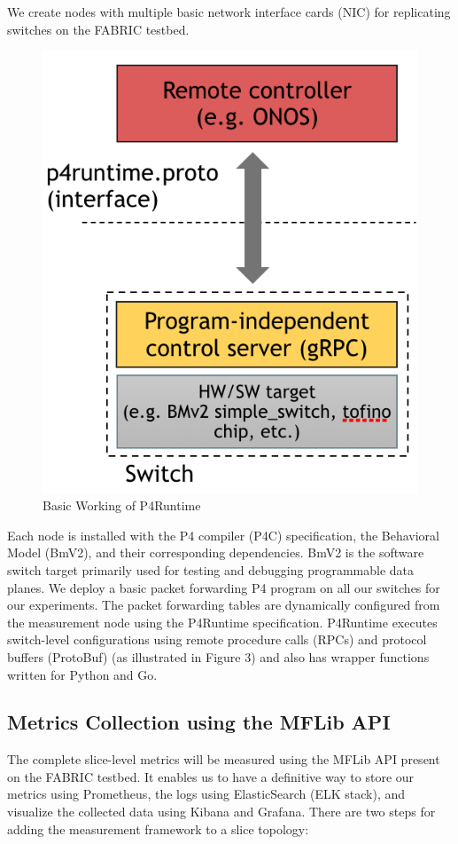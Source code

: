 \documentclass[conference]{IEEEtran}
\begin{document}
     We create nodes with multiple basic network interface cards (NIC) for replicating switches on the FABRIC testbed.  
    \begin{figure}[h!]
            \includegraphics[scale=0.21]{P4Runtime.png}
            \centering
            \caption{Basic Working of P4Runtime}
    \end{figure}
    Each node is installed with the P4 compiler (P4C) specification, the Behavioral Model (BmV2), and their corresponding dependencies. BmV2 is the software switch target primarily used for testing and debugging programmable data planes. We deploy a basic packet forwarding P4 program on all our switches for our experiments. The packet forwarding tables are dynamically configured from the measurement node using the P4Runtime specification. P4Runtime executes switch-level configurations using remote procedure calls (RPCs) and protocol buffers (ProtoBuf) (as illustrated in Figure 3) and also has wrapper functions written for Python and Go.
     

        \subsection{Metrics Collection using the MFLib API}
    The complete slice-level metrics will be measured using the MFLib API present on the FABRIC testbed. It enables us to have a definitive way to store our metrics using Prometheus, the logs using ElasticSearch (ELK stack), and visualize the collected data using Kibana and Grafana. There are two steps for adding the measurement framework to a slice topology: 
    
\end{document}
